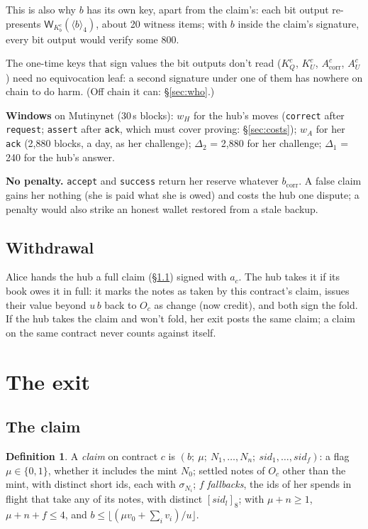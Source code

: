 \documentclass[11pt]{article}
\theoremstyle{plain}
\theoremstyle{definition}
\newtheorem{definition}{Definition}
\newcommand{\bcorr}{b_{\mathrm{corr}}}
\newcommand{\tx}[1]{\texttt{#1}}
\newcommand{\be}[2]{\langle #1\rangle_{#2}}
\newcommand{\pre}[2]{[#1]_{#2}}
\newcommand{\Wots}{\mathsf{W}}
\newcommand{\sid}{\mathit{sid}}
\newcommand{\Oc}{O_c}
\newcommand{\KQ}{K_{Q}^{c}}
\newcommand{\Kb}{K_{b}^{c}}
\newcommand{\KU}{K_{U}^{c}}
\newcommand{\Acorr}{A_{\mathrm{corr}}^{c}}
\newcommand{\AU}{A_{U}^{c}}
\begin{document}
This is also why $b$ has its own key, apart from the claim's: each bit
output re-presents $\Wots_{\Kb}(\be{b}{4})$, about 20 witness items; with
$b$ inside the claim's signature, every bit output would verify some
800.

The one-time keys that sign values the bit outputs don't read ($\KQ$,
$\KU$, $\Acorr$, $\AU$) need no equivocation leaf: a second signature
under one of them has nowhere on chain to do harm. (Off chain it can:
\S\ref{sec:who}.)

\textbf{Windows} on Mutinynet (30\,s blocks): $w_H$ for the hub's moves
(\tx{correct} after \tx{request}; \tx{assert} after \tx{ack}, which must
cover proving: \S\ref{sec:costs}); $w_A$ for her \tx{ack} (2,880 blocks,
a day, as her challenge); $\Delta_2$ = 2,880 for her challenge;
$\Delta_1$ = 240 for the hub's answer.

\textbf{No penalty.} \tx{accept} and \tx{success} return her reserve
whatever $\bcorr$. A false claim
gains her nothing (she is paid what she is owed) and costs the hub one
dispute; a penalty would also strike an honest wallet restored from a
stale backup.

\subsection{Withdrawal}\label{sec:withdrawal}

Alice hands the hub a full claim (\S\ref{sec:claim}) signed with $a_c$.
The hub takes it if its book owes it in full: it marks the notes as
taken by this contract's claim, issues their value beyond $u\,b$ back to
$\Oc$ as change (now credit), and both sign the fold. If the hub takes
the claim and won't fold, her exit posts the same claim; a claim on the
same contract never counts against itself.

\section{The exit}\label{sec:exit}

\subsection{The claim}\label{sec:claim}

\begin{definition}
A \emph{claim} on contract $c$ is $(b;\ \mu;\ N_1, \dots, N_n;\ \sid_1,
\dots, \sid_f)$: a flag $\mu \in \{0, 1\}$, whether it includes the mint
$N_0$; settled notes of $\Oc$ other than the mint, with distinct short
ids, each with $\sigma_{N_i}$; $f$ \emph{fallbacks}, the ids of her
spends in flight that take any of its notes, with distinct
$\pre{\sid_l}{8}$; with $\mu + n \ge 1$, $\mu + n + f \le 4$, and $b \le
\lfloor (\mu v_0 + \sum_i v_i) / u\rfloor$.
\end{definition}
\end{document}
